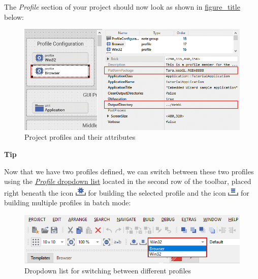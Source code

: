 \documentclass[
  a4paper,
,tablecaptionabove
]{scrbook}
\renewenvironment{quote}{\begin{customblockquote}\list{}{\rightmargin=0em\leftmargin=0em}%
\item\relax\color{blockquote-text}\ignorespaces}{\unskip\unskip\endlist\end{customblockquote}}
\begin{document}
The \emph{Profile} section of your project should now look as shown in
\protect\hyperlink{fig:ProjectProfiles}{figure\_title} below:

\begin{figure}
\centering
\includegraphics{./../asciidoc/modules/ROOT/assets/images/deviceintegration/ProjectProfiles.png}
\caption{Project profiles and their attributes}
\end{figure}

\begin{quote}
\textbf{Tip}

Now that we have two profiles defined, we can switch between these two
profiles using the
\href{https://doc.embedded-wizard.de/menu-build\#9}{\emph{Profile}
dropdown list} located in the second row of the toolbar, placed right
beneath the icon
\includegraphics{./../asciidoc/modules/ROOT/assets/images/icons/BuildProfileIcon.png}
for building the selected profile and the icon
\includegraphics{./../asciidoc/modules/ROOT/assets/images/icons/BuildBatchIcon.png}
for building multiple profiles in batch mode:

\begin{figure}
\centering
\includegraphics{./../asciidoc/modules/ROOT/assets/images/deviceintegration/DropdownProfiles.png}
\caption{Dropdown list for switching between different profiles}
\end{figure}
\end{quote}
\end{document}
